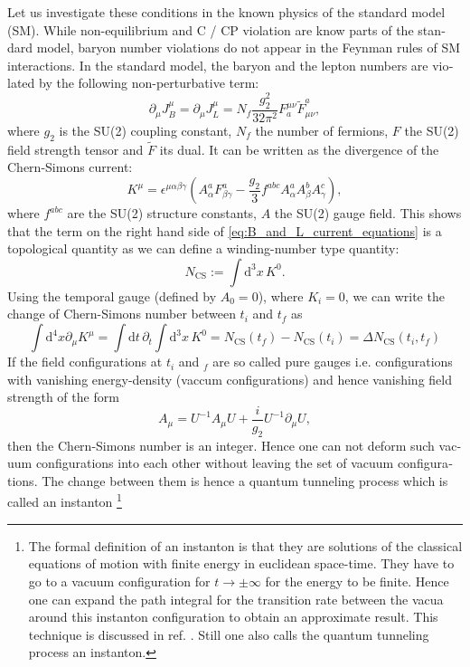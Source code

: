 \documentclass[master,       %
               twoside,        %
               BCOR10mm,       %
               english,ngerman, %
               ]{GAUBM}
\begin{document}
\begin{otherlanguage}{english}
Let us investigate these conditions in the known physics of the standard model (SM). While non-equilibrium and C / CP violation are know parts of the standard model, baryon number violations do not appear in the Feynman rules of SM interactions. In the standard model, the baryon and the lepton numbers are violated by the following non-perturbative term:
\begin{equation}
	\label{eq:B_and_L_current_equations}
	\partial_\mu J^\mu_B = \partial_\mu J^\mu_L = N_f \frac{g_2^2}{32 \pi^2} F^{\mu \nu}_a \tilde{F}_{\mu \nu}^a,
\end{equation}
where $g_2$ is the SU(2) coupling constant, $N_f$ the number of fermions, $F$ the SU(2) field strength tensor and $\tilde{F}$ its dual.
It can be written as the divergence of the Chern-Simons current:
\begin{equation}
	\label{eq:chern_simons_current}
	K^\mu = \epsilon^{\mu \alpha \beta \gamma} \left( A^a_\alpha F^a_{\beta \gamma} - \frac{g_2}{3} f^{abc} A^a_\alpha A^b_\beta A^c_\gamma \right),
\end{equation}
where $f^{abc}$ are the SU(2) structure constants, $A$ the SU(2) gauge field.
This shows that the term on the right hand side of \eqref{eq:B_and_L_current_equations} is a topological quantity as we can define a winding-number type quantity:
\begin{equation}
	N_{\mathrm{CS}} := \int \mathrm{d}^3 x \, K^0.
\end{equation}
Using the temporal gauge (defined by $A_0 = 0$), where $K_i = 0$,
we can write the change of Chern-Simons number between $t_i$ and $t_f$ as
\begin{equation}
	\int \mathrm{d}^4 x \partial_\mu K^\mu = \int \mathrm{d} t \, \partial_t \int \mathrm{d}^3 x \, K^0 =
	N_{\mathrm{CS}}(t_f) - N_{\mathrm{CS}}(t_i) = \Delta N_{\mathrm{CS}}(t_i, t_f)
\end{equation}
If the field configurations at $t_i$ and $_f$ are so called pure gauges i.e. configurations with vanishing energy-density (vaccum configurations) and hence vanishing field strength of the form
\begin{equation}
	A_\mu = U^{-1} A_\mu U + \frac{i}{g_2} U^{-1} \partial_\mu U,
\end{equation}
then the Chern-Simons number is an integer.
Hence one can not deform such vacuum configurations into each other without leaving the set of vacuum configurations.
The change between them is hence a quantum tunneling process which is called an instanton \footnote{
The formal definition of an instanton is that they are solutions of the classical equations of motion with finite energy in euclidean space-time. They have to go to a vacuum configuration for $t \to \pm \infty$ for the energy to be finite. Hence one can expand the path integral for the transition rate between the vacua around this instanton configuration to obtain an approximate result. This technique is discussed in ref. \cite[chap. 7]{aspects_of_symmmetry}. Still one also calls the quantum tunneling process an instanton.
}
\end{otherlanguage}
\end{document}

